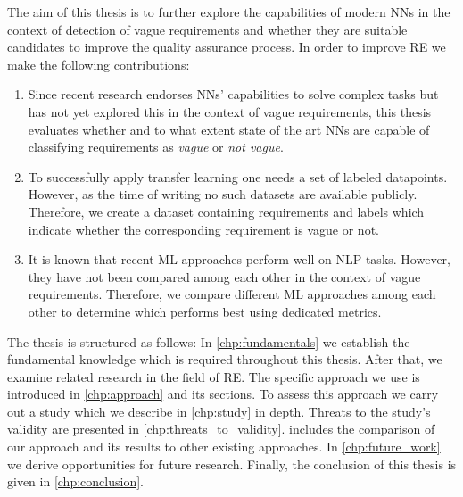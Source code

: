 The aim of this thesis is to further explore the capabilities of modern \acp{NN} in the context of detection of vague requirements and whether they are suitable candidates to improve the quality assurance process.
In order to improve \ac{RE} we make the following contributions:
\begin{enumerate}
    \item Since recent research endorses \acp{NN}' capabilities to solve complex tasks but has not yet explored this in the context of vague requirements, this thesis evaluates whether and to what extent state of the art \acp{NN} are capable of classifying requirements as \textit{vague} or \textit{not vague}.
    \item To successfully apply transfer learning one needs a set of labeled datapoints. However, as the time of writing no such datasets are available publicly.
        Therefore, we create a dataset containing requirements and labels which indicate whether the corresponding requirement is vague or not.
    \item It is known that recent \ac{ML} approaches perform well on \ac{NLP} tasks.
        However, they have not been compared among each other in the context of vague requirements.
        Therefore, we compare different \ac{ML} approaches among each other to determine which performs best using dedicated metrics.
\end{enumerate}

The thesis is structured as follows:
In \cref{chp:fundamentals} we establish the fundamental knowledge which is required throughout this thesis.
After that, we examine related research in the field of \ac{RE}.
The specific approach we use is introduced in \cref{chp:approach} and its sections.
To assess this approach we carry out a study which we describe in \cref{chp:study} in depth.
Threats to the study's validity are presented in \cref{chp:threats_to_validity}.
 includes the comparison of our approach and its results to other existing approaches.
In \cref{chp:future_work} we derive opportunities for future research.
Finally, the conclusion of this thesis is given in \cref{chp:conclusion}.
